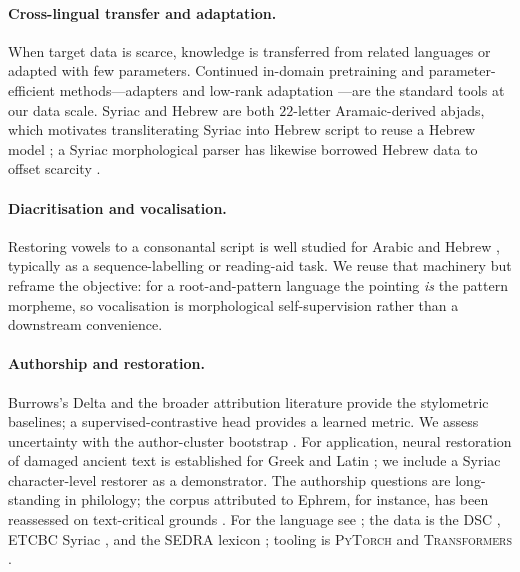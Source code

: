 \documentclass[11pt]{article}
\begin{document}
\paragraph{Cross-lingual transfer and adaptation.}
When target data is scarce, knowledge is transferred from related languages or
adapted with few parameters. Continued in-domain pretraining \citep{gururangan2020dapt}
and parameter-efficient methods---adapters \citep{houlsby2019adapters} and
low-rank adaptation \citep{hu2022lora}---are the standard tools at our data scale.
Syriac and Hebrew are both $22$-letter Aramaic-derived abjads, which motivates
transliterating Syriac into Hebrew script to reuse a Hebrew model
\citep{seker2022alephbert}; a Syriac morphological parser has likewise borrowed
Hebrew data to offset scarcity \citep{naaijer2023transformer}.

\paragraph{Diacritisation and vocalisation.}
Restoring vowels to a consonantal script is well studied for Arabic
\citep{zalmout2019arabic} and Hebrew \citep{gershuni2022hebrew}, typically as a
sequence-labelling or reading-aid task. We reuse that machinery but reframe the
objective: for a root-and-pattern language the pointing \emph{is} the pattern
morpheme, so vocalisation is morphological self-supervision rather than a
downstream convenience.

\paragraph{Authorship and restoration.}
Burrows's Delta \citep{burrows2002delta} and the broader attribution literature
\citep{stamatatos2009survey} provide the stylometric baselines; a
supervised-contrastive head \citep{khosla2020supcon} provides a learned metric. We
assess uncertainty with the author-cluster bootstrap \citep{efron1986bootstrap}.
For application, neural restoration of damaged ancient text is established for
Greek and Latin \citep{assael2022ithaca}; we include a Syriac character-level
restorer as a demonstrator. The authorship questions are long-standing in
philology; the corpus attributed to Ephrem, for instance, has been reassessed on
text-critical grounds \citep{hartung2018authorship}. For the language see
\citet{brock2006introduction,butts2019syriac}; the data is the DSC
\citep{digitalsyriaccorpus}, ETCBC Syriac \citep{etcbcsyriac}, and the SEDRA
lexicon \citep{kiraz1994sedra}; tooling is \textsc{PyTorch}
\citep{paszke2019pytorch} and \textsc{Transformers} \citep{wolf2020transformers}.
\end{document}
